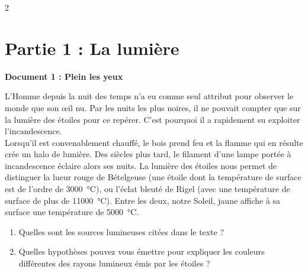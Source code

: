 \documentclass[a3paper,landscape,11pt,fleqn]{article}%
\begin{document}
	\maketitle
\begin{multicols}{2}	
	\section*{Partie 1 : La lumière}
	\begin{minipage}{\linewidth}
	\begin{center} \textbf{Document 1 : Plein les yeux} \end{center}
		L’Homme depuis la nuit des temps n’a eu comme seul attribut pour observer le monde que son œil nu. Par les nuits les plus noires, il ne pouvait compter que sur la lumière des étoiles pour ce repérer. C’est pourquoi il a rapidement su exploiter l’incandescence.\\
		Lorsqu’il est convenablement chauffé, le bois prend feu et la flamme qui en résulte crée un halo de lumière. Des siècles plus tard, le filament d’une lampe portée à incandescence éclaire alors ses nuits. La lumière des étoiles nous permet de distinguer la lueur rouge de Bételgeuse (une étoile dont la température de surface est de l’ordre de \SI{3000}{\celsius}), ou l’éclat bleuté de Rigel (avec une température de surface de plus de \SI{11000}{\celsius}). Entre les deux, notre Soleil, jaune affiche à sa surface une température de \SI{5000}{\celsius}.
		\label{fig:doc1}
	\end{minipage}
	\begin{enumerate}
		\item Quelles sont les sources lumineuses citées dans le texte ?
		\item Quelles hypothèses pouvez vous émettre pour expliquer les couleurs différentes des rayons lumineux émis par les étoiles ?
	\end{enumerate}
	

\end{multicols}
\end{document}
